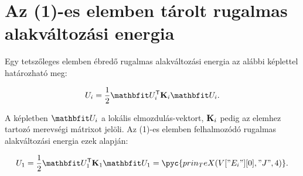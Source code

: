 \clearpage
\section{Az (1)-es elemben tárolt rugalmas alakváltozási energia}

Egy tetszőleges elemben ébredő rugalmas alakváltozási energia az alábbi
képlettel határozható meg:
\begin{myframe}
  \begin{equation}
    U_i = \frac{1}{2} \rvec U_i^{\mathsf T} \rmat K_i \rvec U_i
    \text.
  \end{equation}
\end{myframe}
A képletben $\rvec U_i$ a lokális elmozdulás-vektort, $\mathbf{K}_i$ pedig az
elemhez tartozó merevségi mátrixot jelöli. Az (1)-es elemben felhalmozódó
rugalmas alakváltozási energia ezek alapján:
\begin{myframe}
  \begin{equation}
    U_1
    = \frac{1}{2} \rvec U_1^{\mathsf T} \rmat K_1 \rvec U_1
    = \pyc{prin_TeX(V["E_i"][0], "J", 4)}
    \text.
  \end{equation}
\end{myframe}
